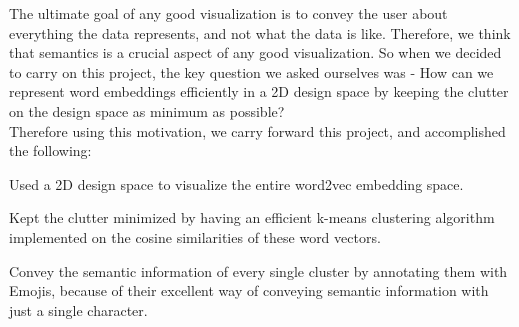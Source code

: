 The ultimate goal of any good visualization is to convey the user about everything the data represents, and not what the data is like. Therefore, we think that semantics is a crucial aspect of any good visualization. So when we decided to carry on this project, the key question we asked ourselves was - How can we represent word embeddings efficiently in a 2D design space by keeping the clutter on the design space as minimum as possible? \\

Therefore using this motivation, we carry forward this project, and accomplished the following:
\begin{itemize*}
 \item Used a 2D design space to visualize the entire word2vec embedding space.
 \item Kept the clutter minimized by having an efficient k-means clustering algorithm implemented on the cosine similarities of these word vectors.
 \item Convey the semantic information of every single cluster by annotating them with Emojis, because of their excellent way of conveying semantic information with just a single character.
\end{itemize*}


